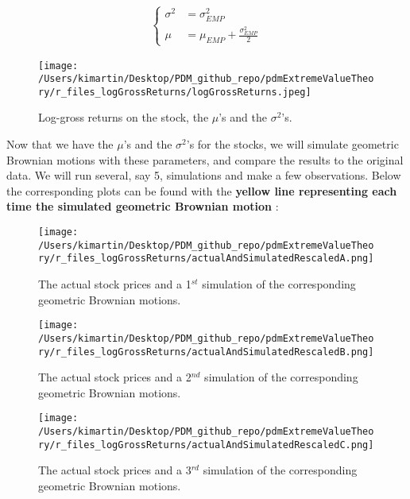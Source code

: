 \begin{equation}
\begin{alignat*}{2}
\begin{cases} \sigma^2 &= \sigma_{EMP}^2\\
\mu &= \mu_{EMP} + \frac{\sigma_{EMP}^2}{2} \end{cases}
\end{alignat*}
\end{equation}\newline	
\newpage
\begin{figure}[h!]
	\centering
		\texttt{[image: /Users/kimartin/Desktop/PDM\_github\_repo/pdmExtremeValueTheory/r\_files\_logGrossReturns/logGrossReturns.jpeg]}
		\caption{Log-gross returns on the stock, the $\mu$'s and the $\sigma^2$'s.}
		\label{fig:LogGrossReturns}
\end{figure}
Now that we have the $\mu$'s and the $\sigma^2$'s for the stocks, we will simulate geometric Brownian motions with these parameters, and compare the results to the original data. We will run several, say 5, simulations and make a few observations. Below the corresponding plots can be found with the \textbf{yellow line representing each time the simulated geometric Brownian motion} :
\begin{figure}[h!]
	\centering
	\texttt{[image: /Users/kimartin/Desktop/PDM\_github\_repo/pdmExtremeValueTheory/r\_files\_logGrossReturns/actualAndSimulatedRescaledA.png]}
	\caption{The actual stock prices and a 1$^{st}$ simulation of the corresponding geometric Brownian motions.}
	\label{fig:ActualAndSimulatedGeomBMs1}
\end{figure}
\newpage
\begin{figure}[h!]
	\centering
	\texttt{[image: /Users/kimartin/Desktop/PDM\_github\_repo/pdmExtremeValueTheory/r\_files\_logGrossReturns/actualAndSimulatedRescaledB.png]}
	\caption{The actual stock prices and a 2$^{nd}$ simulation of the corresponding geometric Brownian motions.}
	\label{fig:ActualAndManySimulatedGeomBMs2}
\end{figure}
\newpage
\begin{figure}[h!]
	\centering
	\texttt{[image: /Users/kimartin/Desktop/PDM\_github\_repo/pdmExtremeValueTheory/r\_files\_logGrossReturns/actualAndSimulatedRescaledC.png]}
	\caption{The actual stock prices and a 3$^{rd}$ simulation of the corresponding geometric Brownian motions.}
	\label{fig:ActualAndManySimulatedGeomBMs3}
\end{figure}
